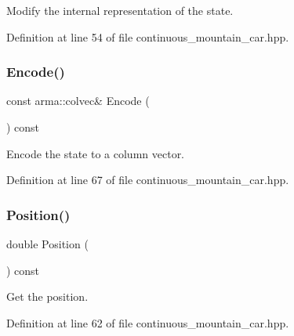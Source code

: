 Modify the internal representation of the state. 



Definition at line 54 of file continuous\+\_\+mountain\+\_\+car.\+hpp.

\mbox{\label{classmlpack_1_1rl_1_1ContinuousMountainCar_1_1State_a8c1a320788b55fad936455caf0acb62a}} 
\subsubsection{Encode()}
{\footnotesize\ttfamily const arma\+::colvec\& Encode (\begin{DoxyParamCaption}{ }\end{DoxyParamCaption}) const\hspace{0.3cm}{\ttfamily [inline]}}



Encode the state to a column vector. 



Definition at line 67 of file continuous\+\_\+mountain\+\_\+car.\+hpp.

\mbox{\label{classmlpack_1_1rl_1_1ContinuousMountainCar_1_1State_adc41cb3d3f5bdd1bd67dc963ce78c20c}} 
\subsubsection{Position()\hspace{0.1cm}{\footnotesize\ttfamily [1/2]}}
{\footnotesize\ttfamily double Position (\begin{DoxyParamCaption}{ }\end{DoxyParamCaption}) const\hspace{0.3cm}{\ttfamily [inline]}}



Get the position. 



Definition at line 62 of file continuous\+\_\+mountain\+\_\+car.\+hpp.



